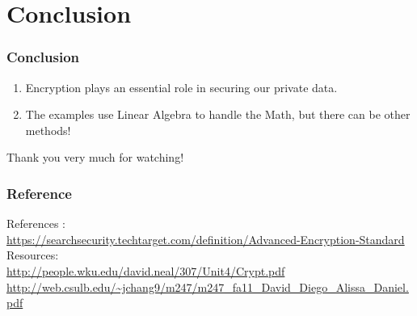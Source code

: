 \documentclass[11pt]{beamer}
\begin{document}
\section{Conclusion}
\begin{frame}\frametitle{Conclusion}
	\begin{enumerate}[]
	\item Encryption plays an essential role in securing our private data.
	\item The examples use Linear Algebra to handle the Math, but there can be other methods!
	\end{enumerate}
\end{frame}

\begin{frame}
	\center Thank you very much for watching!
\end{frame}

\begin{frame}\frametitle{Reference}
References :\\
	\phantom{x}\hspace{3mm}\footnotesize \url{https://searchsecurity.techtarget.com/definition/Advanced-Encryption-Standard}
Resources:\\
	\phantom{x}\hspace{3mm}\footnotesize \url{http://people.wku.edu/david.neal/307/Unit4/Crypt.pdf}\\
	\phantom{x}\hspace{3mm}\footnotesize \url{http://web.csulb.edu/~jchang9/m247/m247_fa11_David_Diego_Alissa_Daniel.pdf}

\end{frame}
\end{document}
